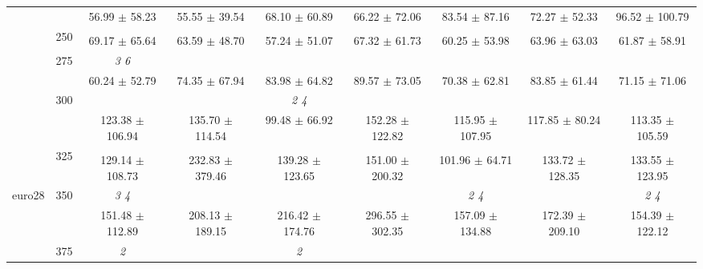 \begin{table}[h]
{\begin{tabular}{
        ccccccccc}
 & & \cellcolor[HTML]{EFEFEF} 56.99 $\pm$ 58.23& \cellcolor[HTML]{EFEFEF} 55.55 $\pm$ 39.54& \cellcolor[HTML]{EFEFEF} 68.10 $\pm$ 60.89& \cellcolor[HTML]{EFEFEF} 66.22 $\pm$ 72.06& \cellcolor[HTML]{EFEFEF} 83.54 $\pm$ 87.16& \cellcolor[HTML]{EFEFEF} 72.27 $\pm$ 52.33& \cellcolor[HTML]{EFEFEF} 96.52 $\pm$ 100.79 \\ 
 & \multirow{2}{*}{250}& & & & & & &  \\ 
 & & 69.17 $\pm$ 65.64& 63.59 $\pm$ 48.70& 57.24 $\pm$ 51.07& 67.32 $\pm$ 61.73& 60.25 $\pm$ 53.98& 63.96 $\pm$ 63.03& 61.87 $\pm$ 58.91 \\ 
 & \multirow{2}{*}{275}& \cellcolor[HTML]{EFEFEF} \textit{ 3 6 }& \cellcolor[HTML]{EFEFEF} & \cellcolor[HTML]{EFEFEF} & \cellcolor[HTML]{EFEFEF} & \cellcolor[HTML]{EFEFEF} & \cellcolor[HTML]{EFEFEF} & \cellcolor[HTML]{EFEFEF}  \\ 
 & & \cellcolor[HTML]{EFEFEF} 60.24 $\pm$ 52.79& \cellcolor[HTML]{EFEFEF} 74.35 $\pm$ 67.94& \cellcolor[HTML]{EFEFEF} 83.98 $\pm$ 64.82& \cellcolor[HTML]{EFEFEF} 89.57 $\pm$ 73.05& \cellcolor[HTML]{EFEFEF} 70.38 $\pm$ 62.81& \cellcolor[HTML]{EFEFEF} 83.85 $\pm$ 61.44& \cellcolor[HTML]{EFEFEF} 71.15 $\pm$ 71.06 \\ 
 & \multirow{2}{*}{300}& & & \textit{ 2 4 }& & & &  \\ 
 & & 123.38 $\pm$ 106.94& 135.70 $\pm$ 114.54& 99.48 $\pm$ 66.92& 152.28 $\pm$ 122.82& 115.95 $\pm$ 107.95& 117.85 $\pm$ 80.24& 113.35 $\pm$ 105.59 \\ 
 & \multirow{2}{*}{325}& \cellcolor[HTML]{EFEFEF} & \cellcolor[HTML]{EFEFEF} & \cellcolor[HTML]{EFEFEF} & \cellcolor[HTML]{EFEFEF} & \cellcolor[HTML]{EFEFEF} & \cellcolor[HTML]{EFEFEF} & \cellcolor[HTML]{EFEFEF}  \\ 
 & & \cellcolor[HTML]{EFEFEF} 129.14 $\pm$ 108.73& \cellcolor[HTML]{EFEFEF} 232.83 $\pm$ 379.46& \cellcolor[HTML]{EFEFEF} 139.28 $\pm$ 123.65& \cellcolor[HTML]{EFEFEF} 151.00 $\pm$ 200.32& \cellcolor[HTML]{EFEFEF} 101.96 $\pm$ 64.71& \cellcolor[HTML]{EFEFEF} 133.72 $\pm$ 128.35& \cellcolor[HTML]{EFEFEF} 133.55 $\pm$ 123.95 \\ 
 \multirow{4}{*}{euro28} & \multirow{2}{*}{350}& \textit{ 3 4 }& & & & \textit{ 2 4 }& & \textit{ 2 4 } \\ 
 & & 151.48 $\pm$ 112.89& 208.13 $\pm$ 189.15& 216.42 $\pm$ 174.76& 296.55 $\pm$ 302.35& 157.09 $\pm$ 134.88& 172.39 $\pm$ 209.10& 154.39 $\pm$ 122.12 \\ 
 & \multirow{2}{*}{375}& \cellcolor[HTML]{EFEFEF} \textit{ 2 }& \cellcolor[HTML]{EFEFEF} & \cellcolor[HTML]{EFEFEF} \textit{ 2 }& \cellcolor[HTML]{EFEFEF} & \cellcolor[HTML]{EFEFEF} & \cellcolor[HTML]{EFEFEF} & \cellcolor[HTML]{EFEFEF}  \\ 

\end{tabular}}
\end{table}
